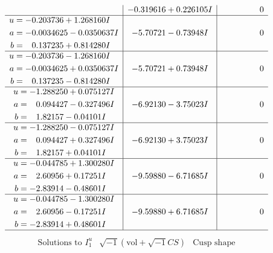 \documentclass[1p]{elsarticle_modified}
\theoremstyle{definition}
\newcommand{\I}{\sqrt{-1}}
\begin{document}
$$\begin{array}{c|c|c}
 & -0.319616 + 0.226105 I & \phantom{-0.000000 } 0 \\ \hline\begin{aligned}
u &= -0.203736 + 1.268160 I \\
a &= -0.0034625 - 0.0350637 I \\
b &= \phantom{-}0.137235 + 0.814280 I\end{aligned}
 & -5.70721 - 0.73948 I & \phantom{-0.000000 } 0 \\ \hline\begin{aligned}
u &= -0.203736 - 1.268160 I \\
a &= -0.0034625 + 0.0350637 I \\
b &= \phantom{-}0.137235 - 0.814280 I\end{aligned}
 & -5.70721 + 0.73948 I & \phantom{-0.000000 } 0 \\ \hline\begin{aligned}
u &= -1.288250 + 0.075127 I \\
a &= \phantom{-}0.094427 - 0.327496 I \\
b &= \phantom{-}1.82157 - 0.04101 I\end{aligned}
 & -6.92130 - 3.75023 I & \phantom{-0.000000 } 0 \\ \hline\begin{aligned}
u &= -1.288250 - 0.075127 I \\
a &= \phantom{-}0.094427 + 0.327496 I \\
b &= \phantom{-}1.82157 + 0.04101 I\end{aligned}
 & -6.92130 + 3.75023 I & \phantom{-0.000000 } 0 \\ \hline\begin{aligned}
u &= -0.044785 + 1.300280 I \\
a &= \phantom{-}2.60956 + 0.17251 I \\
b &= -2.83914 - 0.48601 I\end{aligned}
 & -9.59880 - 6.71685 I & \phantom{-0.000000 } 0 \\ \hline\begin{aligned}
u &= -0.044785 - 1.300280 I \\
a &= \phantom{-}2.60956 - 0.17251 I \\
b &= -2.83914 + 0.48601 I\end{aligned}
 & -9.59880 + 6.71685 I & \phantom{-0.000000 } 0\\
 \hline 
 \end{array}$$\newpage$$\begin{array}{c|c|c}  
\text{Solutions to }I^u_{1}& \I (\text{vol} + \sqrt{-1}CS) & \text{Cusp shape}\\

\end{array}$$
\end{document}
